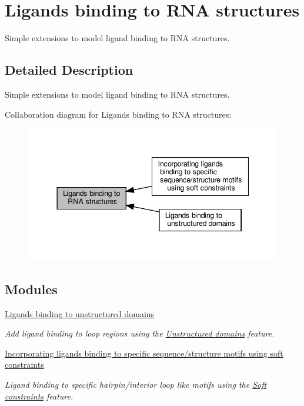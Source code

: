 \hypertarget{group__ligand__binding}{}\section{Ligands binding to R\+NA structures}
\label{group__ligand__binding}


Simple extensions to model ligand binding to R\+NA structures.  




\subsection{Detailed Description}
Simple extensions to model ligand binding to R\+NA structures. 

Collaboration diagram for Ligands binding to R\+NA structures\+:
\nopagebreak
\begin{figure}[H]
\begin{center}
\leavevmode
\includegraphics[width=344pt]{group__ligand__binding}
\end{center}
\end{figure}
\subsection*{Modules}
\begin{DoxyCompactItemize}
\item 
\hyperlink{group__ligands__up}{Ligands binding to unstructured domains}
\begin{DoxyCompactList}\small\item\em Add ligand binding to loop regions using the \hyperlink{group__domains__up}{Unstructured domains} feature. \end{DoxyCompactList}\item 
\hyperlink{group__constraints__ligand}{Incorporating ligands binding to specific sequence/structure motifs using soft constraints}
\begin{DoxyCompactList}\small\item\em Ligand binding to specific hairpin/interior loop like motifs using the \hyperlink{group__soft__constraints}{Soft constraints} feature. \end{DoxyCompactList}\end{DoxyCompactItemize}
